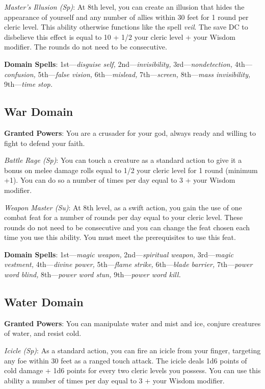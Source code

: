 \textit{Master's Illusion (Sp)}: At 8th level, you can create an illusion that hides the appearance of yourself 
and any number of allies within 30 feet for 1 round per cleric level. This ability otherwise functions like the
spell \textit{veil}. The save DC to disbelieve this effect is equal to 10 + 1/2 your cleric level + your Wisdom 
modifier. The rounds do not need to be consecutive.
				
\textbf{Domain Spells}: 1st---\textit{disguise self, }2nd---\textit{invisibility,} 3rd---\textit{nondetection, }4th---\textit{confusion, }5th---\textit{false vision, }6th---\textit{mislead, }7th---\textit{screen, }8th---\textit{mass invisibility, }9th---\textit{time stop.}
				
\subsection{War Domain}

				
\textbf{Granted Powers}: You are a crusader for your god, always ready and willing to fight to defend your faith.
				
\textit{Battle Rage (Sp)}: You can touch a creature as a standard action to give it a bonus on melee damage rolls
equal to 1/2 your cleric level for 1 round (minimum +1). You can do so a number of times per day equal to 3 + your
Wisdom modifier.

\textit{Weapon Master (Su)}: At 8th level, as a swift action, you gain the use of one combat feat for a number of
rounds per day equal to your cleric level. These rounds do not need to be consecutive and you can change the feat
chosen each time you use this ability. You must meet the prerequisites to use this feat.

\textbf{Domain Spells}: 1st---\textit{magic weapon, }2nd---\textit{spiritual weapon,} 3rd---\textit{magic vestment, }4th---\textit{divine power, }5th---\textit{flame strike, }6th---\textit{blade barrier, }7th---\textit{power word blind, }8th---\textit{power word stun, }9th---\textit{power word kill.}

\subsection{Water Domain}


\textbf{Granted Powers}: You can manipulate water and mist and ice, conjure creatures of water, and resist cold.
				
\textit{Icicle (Sp)}: As a standard action, you can fire an icicle from your finger, targeting any foe within 30
feet as a ranged touch attack. The icicle deals 1d6 points of cold damage + 1d6 points for every two cleric levels 
you possess. You can use this ability a number of times per day equal to 3 + your Wisdom modifier.
				
